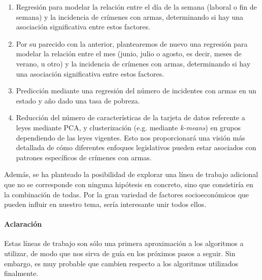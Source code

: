 \documentclass[11pt,a4paper]{article}
\begin{document}
\begin{enumerate}
    \item Regresión para modelar la relación entre el día de la semana (laboral o fin de semana) y la incidencia de crímenes con armas, determinando si hay una asociación significativa entre estos factores.
    \item Por su parecido con la anterior, plantearemos de nuevo una regresión para modelar la relación entre el mes (junio, julio o agosto, es decir, meses de verano, u otro) y la incidencia de crímenes con armas, determinando si hay una asociación significativa entre estos factores.
    \item Predicción mediante una regresión del número de incidentes con armas en un estado y año dado una tasa de pobreza.
    \item Reducción del número de características de la tarjeta de datos referente a leyes mediante PCA, y clusterización (e.g. mediante \textit{k-means}) en grupos dependiendo de las leyes vigentes. Esto nos proporcionará una visión más detallada de cómo diferentes enfoques legislativos pueden estar asociados con patrones específicos de crímenes con armas.
\end{enumerate}

Además, se ha planteado la posibilidad de explorar una línea de trabajo adicional que no se corresponde con ninguna hipótesis en concreto, sino que consistiría en la combinación de todas. Por la gran variedad de factores socioeconómicos que pueden influir en nuestro tema, sería interesante unir todos ellos.

\paragraph{Aclaración} Estas líneas de trabajo son sólo una primera aproximación a los algoritmos a utilizar, de modo que nos sirva de guía en los próximos pasos a seguir. Sin embargo, es muy probable que cambien respecto a los algoritmos utilizados finalmente.
\end{document}
